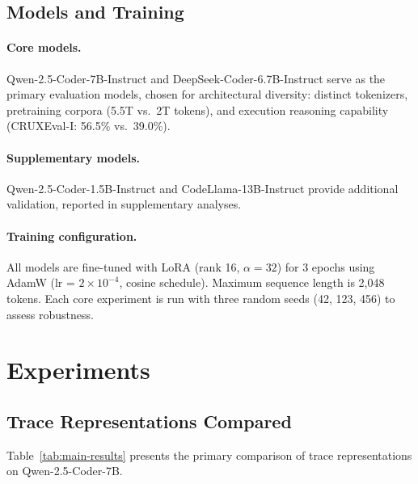 \documentclass[11pt,a4paper]{article}
\begin{document}
\subsection{Models and Training}

\paragraph{Core models.} Qwen-2.5-Coder-7B-Instruct and DeepSeek-Coder-6.7B-Instruct serve as the primary evaluation models, chosen for architectural diversity: distinct tokenizers, pretraining corpora (5.5T vs.\ 2T tokens), and execution reasoning capability (CRUXEval-I: 56.5\% vs.\ 39.0\%).

\paragraph{Supplementary models.} Qwen-2.5-Coder-1.5B-Instruct and CodeLlama-13B-Instruct provide additional validation, reported in supplementary analyses.

\paragraph{Training configuration.} All models are fine-tuned with LoRA (rank 16, $\alpha = 32$) for 3 epochs using AdamW (lr = $2 \times 10^{-4}$, cosine schedule).
Maximum sequence length is 2,048 tokens.
Each core experiment is run with three random seeds (42, 123, 456) to assess robustness.

\section{Experiments}

\subsection{Trace Representations Compared}
\label{sec:main-results}

Table~\ref{tab:main-results} presents the primary comparison of trace representations on Qwen-2.5-Coder-7B.
\end{document}

